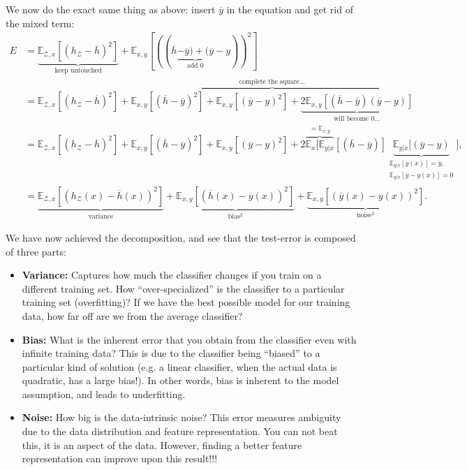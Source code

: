 \documentclass{article}
\begin{document}
We now do the exact same thing as above: insert $\overline{y}$ in the equation and get rid of the mixed term:
\begin{align}
    E & = \underbrace{\mathbb{E}_{\mathcal{Z},x}[(h_\mathcal{Z} - \overline{h})^2]}_\text{keep untouched} + \mathbb{E}_{x,y}[((\overline{h} \underbrace{-\overline{y})+(\overline{y}}_\text{add 0} - y))^2]\\
    & = \mathbb{E}_{\mathcal{Z},x}[(h_\mathcal{Z} - \overline{h})^2] + \overbrace{\mathbb{E}_{x,y}[(\overline{h} -\overline{y})^2]+\mathbb{E}_{x,y}[(\overline{y} - y)^2] + \underbrace{2\mathbb{E}_{x,y}[(\overline{h} -\overline{y})(\overline{y} - y)]}_\text{will become 0...}}^\text{complete the square...}\\
    & = \mathbb{E}_{\mathcal{Z},x}[(h_\mathcal{Z} - \overline{h})^2] + \mathbb{E}_{x,y}[(\overline{h} -\overline{y})^2]+\mathbb{E}_{x,y}[(\overline{y} - y)^2] + 2\overbrace{\mathbb{E}_{x}[\mathbb{E}_{y|x}}^{=\mathbb{E}_{x,y}}[(\overline{h} -\overline{y})]\underbrace{\mathbb{E}_{y|x}[(\overline{y} - y)}_{\substack{\mathbb{E}_{y|x}[y(x)]=\overline{y},\\\mathbb{E}_{y|x}[\overline{y}-y(x)]=0}}],\\
    &=\underbrace{\mathbb{E}_{\mathcal{Z},x}[(h_\mathcal{Z}(x) - \overline{h}(x))^2]}_\text{variance} + \underbrace{\mathbb{E}_{x,y}[(\overline{h}(x) -\overline{y}(x))^2]}_\text{bias$^2$} + \underbrace{\mathbb{E}_{x,y}[(\overline{y}(x) - y(x))^2]}_\text{noise$^2$}.
\end{align}

\begin{spexample}
We have now achieved the decomposition, and see that the test-error is composed of three parts:
    \begin{itemize}\itemsep0em
    \item \textbf{Variance:} Captures how much the classifier changes if you train on a different training set. How ``over-specialized'' is the classifier to a particular training set (overfitting)? If we have the best possible model for our training data, how far off are we from the average classifier? 

    \item \textbf{Bias:} What is the inherent error that you obtain from the classifier even with infinite training data? This is due to the classifier being ``biased'' to a particular kind of solution (e.g. a linear classifier, when the actual data is quadratic, has a large bias!). In other words, bias is inherent to the model assumption, and leads to underfitting.

    \item \textbf{Noise:} How big is the data-intrinsic noise? This error measures ambiguity due to the data distribution and feature representation. You can not beat this, it is an aspect of the data. However, finding a better feature representation can improve upon this result!!!
\end{itemize}
\end{spexample}
\end{document}
